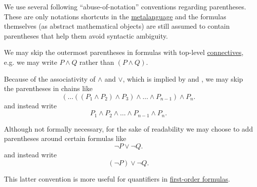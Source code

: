 \begin{remark}\label{rem:propositional_formula_parentheses}
  We use several following \enquote{abuse-of-notation} conventions regarding parentheses. These are only notations shortcuts in the \hyperref[rem:metalogic]{metalanguage} and the formulas themselves (as abstract mathematical objects) are still assumed to contain parentheses that help them avoid syntactic ambiguity.

  \begin{thmenum}
     We may skip the outermost parentheses in formulas with top-level \hyperref[def:propositional_language/connectives]{connectives}, e.g. we may write \( P \wedge Q \) rather than \( (P \wedge Q) \).

     Because of the associativity of \( \wedge \) and \( \vee \), which is implied by  and , we may skip the parentheses in chains like
    \begin{equation*}
      ( \ldots ((P_1 \wedge P_2) \wedge P_3) \wedge \ldots \wedge P_{n-1} ) \wedge P_n.
    \end{equation*}
    and instead write
    \begin{equation*}
      P_1 \wedge P_2 \wedge \ldots \wedge P_{n-1} \wedge P_n.
    \end{equation*}

     Although not formally necessary, for the sake of readability we may choose to add parentheses around certain formulas like
    \begin{equation*}
      \neg P \vee \neg Q.
    \end{equation*}
    and instead write
    \begin{equation*}
      (\neg P) \vee \neg Q.
    \end{equation*}

    This latter convention is more useful for quantifiers in \hyperref[def:first_order_syntax/formula]{first-order formulas}.
  \end{thmenum}
\end{remark}

